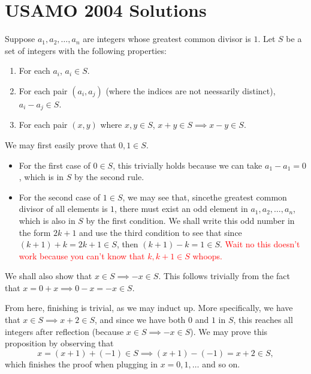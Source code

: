 \documentclass[a4paper, 12pt]{article}
\begin{document}
\section*{USAMO 2004 Solutions}

\setcounter{pnum}{1}

\begin{chirpbox}
    \begin{problemnum}
        Suppose \( a_1, a_2, \ldots, a_n  \) are integers whose greatest common divisor is \( 1 \). Let \( S \) be a set of integers with the following properties:
        \begin{enumerate}[label=\textbf{\alph*.}]
            \item For each \( a_i \), \( a_i \in S \).
            \item For each pair \( (a_i, a_j) \) (where the indices are not neessarily distinct), \( a_i - a_j \in S \).
            \item For each pair \( (x, y) \) where \( x, y \in S \), \( x + y \in S \implies x - y \in S \).
        \end{enumerate}
    \end{problemnum}
\end{chirpbox}

\begin{solution}
    We may first easily prove that \( 0, 1 \in S \).
    \begin{itemize}
        \item For the first case of \( 0 \in S \), this trivially holds because we can take \( a_1 - a_1 = 0 \), which is in \( S \) by the second rule.
        \item For the second case of \( 1 \in S \), we may see that, sincethe greatest common divisor of all elements is \( 1 \), there must exist an odd element in \( a_1, a_2, \ldots, a_n \), which is also in \( S \) by the first condition. We shall write this odd number in the form \( 2k + 1 \) and use the third condition to see that since \( (k + 1) + k = 2k + 1 \in S \), then \( (k + 1) - k = 1 \in S \). \textcolor{red}{Wait no this doesn't work because you can't know that \( k, k + 1 \in S \) whoops.}
    \end{itemize}

    We shall also show that \( x \in S \implies -x \in S \). This follows trivially from the fact that \( x = 0 + x \implies 0 - x = -x \in S \).
    
    From here, finishing is trivial, as we may induct up. More specifically, we have that \( x \in S \implies x + 2 \in S \), and since we have both \( 0 \) and \( 1 \) in \( S \), this reaches all integers after reflection (because \( x \in S \implies -x \in S \)). We may prove this proposition by observing that
    \[
        x = (x + 1) + (-1) \in S \implies (x + 1) - (-1) = x + 2 \in S
    ,\]
    which finishes the proof when plugging in \( x = 0, 1, \ldots \) and so on.
\end{solution}
\end{document}
